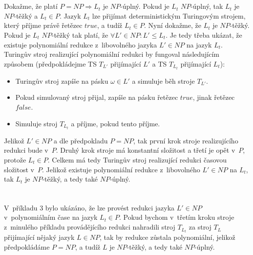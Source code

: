 \documentclass[a4paper]{article}
\newcommand{\ltl}{L_t}
\begin{document}
\section*{}
Dokažme, že platí $P=NP \Rightarrow \ltl$ je $NP$-úplný.
Pokud je $\ltl$ $NP$-úplný, tak $\ltl$ je $NP$-těžký a $\ltl \in P$.
Jazyk $\ltl$ lze přijímat deterministickým Turingovým strojem, který příjme právě řetězec $true$, a tudíž $\ltl \in P$.
Nyní dokažme, že $\ltl$ je $NP$-těžký.
Pokud je $\ltl$ $NP$-těžký tak platí, že $\forall L' \in NP: L' \leq \ltl$.
Je tedy třeba ukázat, že existuje polynomiální redukce z~libovolného jazyka $L' \in NP$ na jazyk $\ltl$.
Turingův stroj realizující polynomiální redukci by fungoval následujícím způsobem (předpokládejme TS $T_{L'}$ přijímající $L'$ a TS $T_{\ltl}$
přijímající $\ltl$):
\begin{itemize}
    \item Turingův stroj zapíše na pásku $\omega \in L'$ a simuluje běh stroje $T_{L'}$.
    \item Pokud simulovaný stroj přijal, zapíše na pásku řetězec $true$, jinak řetězec $false$.
    \item Simuluje stroj $T_{\ltl}$ a příjme, pokud tento příjme.
\end{itemize}
Jelikož $L' \in NP$ a dle předpokladu $P=NP$, tak první krok stroje realizujícího redukci bude v~$P$.
Druhý krok stroje má konstantní složitost a třetí je opět v~$P$, protože $\ltl \in P$.
Celkem má tedy Turingův stroj realizující redukci časovou složitost v~$P$.
Jelikož existuje polynomiální redukce z~libovolného $L' \in NP$ na $\ltl$, tak $\ltl$ je $NP$-těžký, a tedy také $NP$-úplný.

\section*{}
V~příkladu 3 bylo ukázáno, že lze provést redukci jazyka $L' \in NP$ v~polynomiálním čase na jazyk $\ltl \in P$.
Pokud bychom v~třetím kroku stroje z~minulého příkladu provádějícího redukci nahradili stroj $T_{\ltl}$ za stroj $T_L$ přijímající
nějaký jazyk $L\in NP$, tak by redukce zůstala polynomiální, jelikož předpokládáme $P=NP$, a tudíž $L$ je $NP$-těžký, a tedy také
$NP$-úplný.
\end{document}
